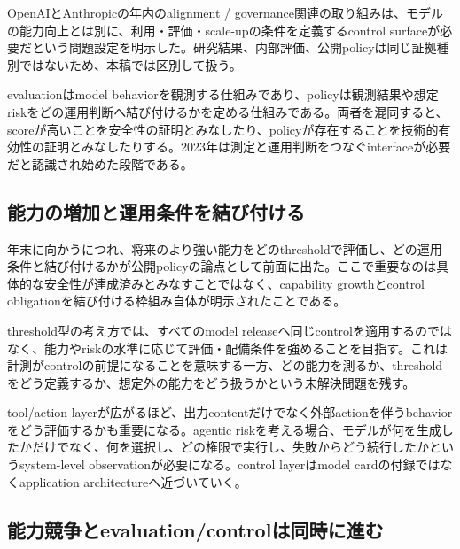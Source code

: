 OpenAIとAnthropicの年内のalignment / governance関連の取り組みは、モデルの能力向上とは別に、利用・評価・scale-upの条件を定義するcontrol surfaceが必要だという問題設定を明示した。研究結果、内部評価、公開policyは同じ証拠種別ではないため、本稿では区別して扱う。\autocite{src-25adcaa1c831,src-394ea6d17701,src-8f63dfa1697f,src-a1c8df89a3c9,src-b276b4af9d56,src-b6a5fdb87e9f}


evaluationはmodel behaviorを観測する仕組みであり、policyは観測結果や想定riskをどの運用判断へ結び付けるかを定める仕組みである。両者を混同すると、scoreが高いことを安全性の証明とみなしたり、policyが存在することを技術的有効性の証明とみなしたりする。2023年は測定と運用判断をつなぐinterfaceが必要だと認識され始めた段階である。\autocite{src-14f8acc117f1,src-1df7a91d31ec,src-25adcaa1c831,src-394ea6d17701,src-8f63dfa1697f,src-a1c8df89a3c9,src-b276b4af9d56,src-b2d10cbd609c,src-b6a5fdb87e9f}


\subsection{能力の増加と運用条件を結び付ける}

年末に向かうにつれ、将来のより強い能力をどのthresholdで評価し、どの運用条件と結び付けるかが公開policyの論点として前面に出た。ここで重要なのは具体的な安全性が達成済みとみなすことではなく、capability growthとcontrol obligationを結び付ける枠組み自体が明示されたことである。\autocite{src-25adcaa1c831,src-394ea6d17701,src-8f63dfa1697f,src-a1c8df89a3c9,src-b276b4af9d56,src-b6a5fdb87e9f}


threshold型の考え方では、すべてのmodel releaseへ同じcontrolを適用するのではなく、能力やriskの水準に応じて評価・配備条件を強めることを目指す。これは計測がcontrolの前提になることを意味する一方、どの能力を測るか、thresholdをどう定義するか、想定外の能力をどう扱うかという未解決問題を残す。\autocite{src-25adcaa1c831,src-394ea6d17701,src-8f63dfa1697f,src-a1c8df89a3c9,src-b276b4af9d56,src-b6a5fdb87e9f}


tool/action layerが広がるほど、出力contentだけでなく外部actionを伴うbehaviorをどう評価するかも重要になる。agentic riskを考える場合、モデルが何を生成したかだけでなく、何を選択し、どの権限で実行し、失敗からどう続行したかというsystem-level observationが必要になる。control layerはmodel cardの付録ではなくapplication architectureへ近づいていく。\autocite{src-25adcaa1c831,src-394ea6d17701,src-8f63dfa1697f,src-a1c8df89a3c9,src-b276b4af9d56,src-b6a5fdb87e9f}


\subsection{能力競争とevaluation/controlは同時に進む}

